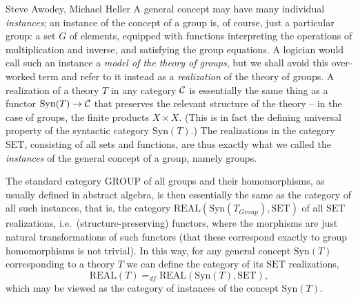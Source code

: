 \begin{artengenv2auth}{Steve Awodey, Michael Heller}
A general concept may have many individual \emph{instances}; an instance of the concept of a group is, of course, just a particular group: a set $G$ of elements, equipped with functions interpreting the operations of multiplication and inverse, and satisfying the group equations.  A logician would call such an instance a \emph{model of the theory of groups}, but we shall avoid this over-worked term and refer to it instead as a \emph{realization} of the theory of groups.  A realization of a theory $T$ in any category $\mbox{${\mathcal{C} }$}$ is essentially the same thing as a functor $\mathrm{Syn}(T) \to \mbox{${\mathcal{C} }$}$ that preserves the relevant structure of the theory -- in the case of groups, the finite products $X\times X$.  (This is in fact the defining universal property of the syntactic category $\mathrm{Syn}(T)$.)  The realizations in the category SET, consisting of all sets and functions, are thus exactly what we called the \emph{instances} of the general concept of a group, namely groups.  

The standard category $\mathrm{GROUP}$ of all groups and their homomorphisms, as usually defined in abstract algebra, is then essentially the same as the category of all such instances, that is, the category $\mathrm{REAL}(\mathrm{Syn}(T_{Group}), \mathrm{SET})$ of all $\mathrm{SET}$ realizations, i.e.\ (structure-preserving) functors, where the morphisms are just natural transformations of such functors (that these correspond exactly to group homomorphisms is not trivial).  In this way, for any general concept $\mathrm{Syn}(T)$ corresponding to a theory $T$ we can define the category of its $\mathrm{SET}$ realizations, 
\[
\mathrm{REAL}(T) =_{df} \mathrm{REAL}(\mathrm{Syn}(T), \mathrm{SET}),
\]
which may be viewed as the category of instances of the concept $\mathrm{Syn}(T)$.


\end{artengenv2auth}
